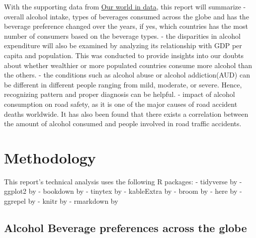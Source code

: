 \documentclass[11pt,a4paper,]{article}
\begin{document}
With the supporting data from \href{https://ourworldindata.org/}{Our world in data}, this report will summarize
- overall alcohol intake, types of beverages consumed across the globe and has the beverage preference changed over the years, if yes, which countries has the most number of consumers based on the beverage types.
- the disparities in alcohol expenditure will also be examined by analyzing its relationship with GDP per capita and population. This was conducted to provide insights into our doubts about whether wealthier or more populated countries consume more alcohol than the others.
- the conditions such as alcohol abuse or alcohol addiction(AUD) can be different in different people ranging from mild, moderate, or severe. Hence, recognizing pattern and proper diagnosis can be helpful.
- impact of alcohol consumption on road safety, as it is one of the major causes of road accident deaths worldwide. It has also been found that there exists a correlation between the amount of alcohol consumed and people involved in road traffic accidents.

\section{Methodology}\label{methodology}

This report's technical analysis uses the following R packages: \newline
- tidyverse by \textcite{tidyverse} \newline
- ggplot2 by \textcite{ggplot2} \newline
- bookdown by \textcite{Xie2020-es} \newline
- tinytex by \textcite{tinytex} \newline
- kableExtra by \textcite{kableExtra} \newline
- broom by \textcite{broom} \newline
- here by \textcite{here} \newline
- ggrepel by \textcite{ggrepel} \newline
- knitr by \textcite{knitr} \newline
- rmarkdown by \textcite{rmarkdown} \newline

\subsection{Alcohol Beverage preferences across the globe}\label{alcohol-beverage-preferences-across-the-globe}
\end{document}

